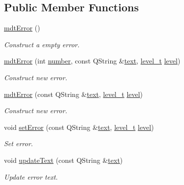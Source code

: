 \subsection*{Public Member Functions}
\begin{DoxyCompactItemize}
\item 
\hyperlink{classmdt_error_a78824dc8c0029107949baaf28c4a9df5}{mdt\-Error} ()
\begin{DoxyCompactList}\small\item\em Construct a empty error. \end{DoxyCompactList}\item 
\hyperlink{classmdt_error_a377c175cc8e1aeae543cae2ecc5ca87b}{mdt\-Error} (int \hyperlink{classmdt_error_ad233adb8efe4180b85f584c5afdd49fc}{number}, const Q\-String \&\hyperlink{classmdt_error_a8630bb6b21b70edfe3d13eaff82a1baf}{text}, \hyperlink{classmdt_error_a5c8b1a040e2feaa848f6201d6b6f0cd7}{level\-\_\-t} \hyperlink{classmdt_error_a8d8382d3008de890689df415deb7766e}{level})
\begin{DoxyCompactList}\small\item\em Construct new error. \end{DoxyCompactList}\item 
\hyperlink{classmdt_error_a775542a251ef746f3433e7d790a48d85}{mdt\-Error} (const Q\-String \&\hyperlink{classmdt_error_a8630bb6b21b70edfe3d13eaff82a1baf}{text}, \hyperlink{classmdt_error_a5c8b1a040e2feaa848f6201d6b6f0cd7}{level\-\_\-t} \hyperlink{classmdt_error_a8d8382d3008de890689df415deb7766e}{level})
\begin{DoxyCompactList}\small\item\em Construct new error. \end{DoxyCompactList}\item 
void \hyperlink{classmdt_error_a8e7961a665841c1b052116e4dd2eb855}{set\-Error} (const Q\-String \&\hyperlink{classmdt_error_a8630bb6b21b70edfe3d13eaff82a1baf}{text}, \hyperlink{classmdt_error_a5c8b1a040e2feaa848f6201d6b6f0cd7}{level\-\_\-t} \hyperlink{classmdt_error_a8d8382d3008de890689df415deb7766e}{level})
\begin{DoxyCompactList}\small\item\em Set error. \end{DoxyCompactList}\item 
void \hyperlink{classmdt_error_ace38a9600c19ddf3628d46b1a6a7b414}{update\-Text} (const Q\-String \&\hyperlink{classmdt_error_a8630bb6b21b70edfe3d13eaff82a1baf}{text})
\begin{DoxyCompactList}\small\item\em Update error text. \end{DoxyCompactList}\item 

\end{DoxyCompactItemize}
